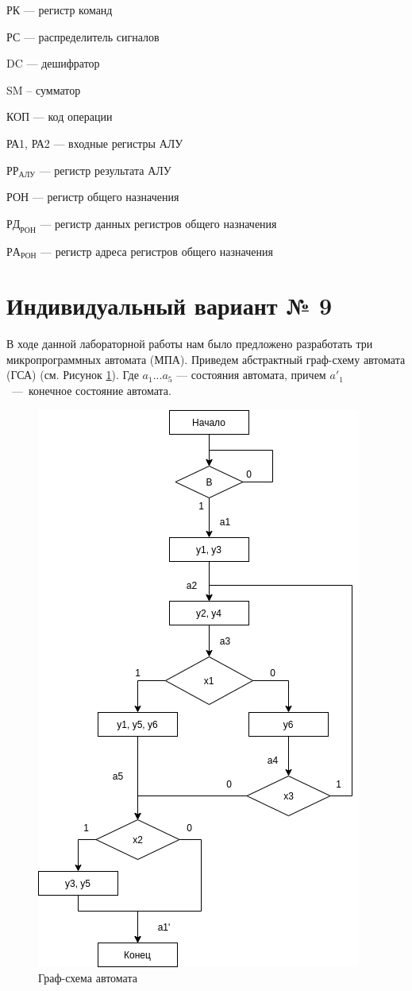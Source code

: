 \documentclass[a4paper,14pt]{extarticle}
\begin{document}
	
	
	
	РК  --- регистр команд
	
	РС  --- распределитель сигналов
	
	DC  --- дешифратор
	
	SM -- сумматор
	
	КОП --- код операции
	
	РА1, РА2 --- входные регистры АЛУ
	
	
	$РР_{АЛУ}$ --- регистр результата АЛУ
	
	РОН --- регистр общего назначения
	
	
	$РД_{РОН}$  --- регистр данных регистров общего назначения
	
	$РА_{РОН}$  --- регистр адреса регистров общего назначения
	
	

	
\section {Индивидуальный вариант № 9}
	В ходе данной лабораторной работы нам было предложено разработать три микропрограммных автомата (МПА). Приведем абстрактный граф-схему автомата (ГСА) (см. Рисунок \ref{fig:gsa}). Где  $a_1 ... a_5$ --- состояния автомата, причем $a'_1$~---~конечное состояние автомата.
	\begin{figure}[htpb]
		\centering
		\includegraphics[width=0.5\linewidth]{images/gsa}
		\caption{Граф-схема автомата}
		\label{fig:gsa}
	\end{figure}
	
\end{document}
